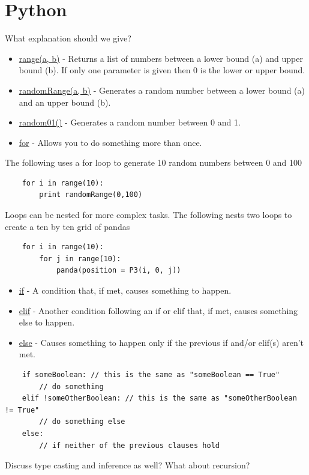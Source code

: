\documentclass[10pt]{article}
\begin{document}
\section*{Python}
What explanation should we give?
\begin{itemize}
    \item \underline{range(a, b)} - Returns a list of numbers between a lower bound (a) and upper bound (b).
    If only one parameter is given then 0 is the lower or upper bound.
    \item \underline{randomRange(a, b)} - Generates a random number between a lower bound (a) and an upper bound (b).
    \item \underline{random01()} - Generates a random number between 0 and 1.
    \item \underline{for} - Allows you to do something more than once.
\end{itemize}
The following uses a for loop to generate 10 random numbers between 0 and 100
\begin{lstlisting}
    for i in range(10):
        print randomRange(0,100)
\end{lstlisting}
Loops can be nested for more complex tasks.
The following nests two loops to create a ten by ten grid of pandas
\begin{lstlisting}
    for i in range(10):
        for j in range(10):
            panda(position = P3(i, 0, j))
\end{lstlisting}
\begin{itemize}
    \item \underline{if} - A condition that, if met, causes something to happen.
    \item \underline{elif} - Another condition following an if or elif that, if met, causes something else to happen.
    \item \underline{else} - Causes something to happen only if the previous if and/or elif(s) aren't met.
\end{itemize}
\begin{lstlisting}
    if someBoolean: // this is the same as "someBoolean == True"
        // do something
    elif !someOtherBoolean: // this is the same as "someOtherBoolean != True"
        // do something else
    else:
        // if neither of the previous clauses hold
\end{lstlisting}
Discuss type casting and inference as well? What about recursion?
\end{document}
